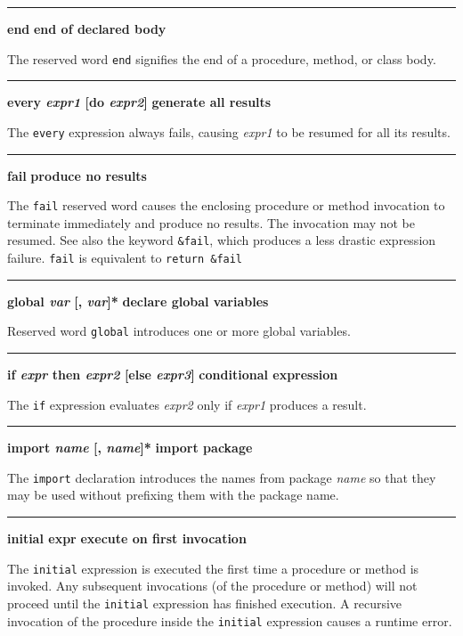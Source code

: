 \bigskip\hrule\vspace{0.1cm}
\noindent
{\bf end } \hfill {\bf end of declared body}

\noindent
{}The reserved word \texttt{end} signifies the end of a
procedure, method, or class body.

\bigskip\hrule\vspace{0.1cm}
\noindent
{\bf \textbf{every} \textit{expr1} [do \textit{expr2}] } \hfill {\bf generate all results}

\noindent
{}The \texttt{every} expression always fails, causing
\textit{expr1} to be resumed for all its results.

\bigskip\hrule\vspace{0.1cm}
\noindent
{\bf fail } \hfill {\bf produce no results}

\noindent
{}The \texttt{fail} reserved word causes the enclosing
procedure or method invocation to terminate immediately and produce no
results. The invocation may not be resumed. See also the keyword
\texttt{\&fail}, which produces a less drastic expression failure.
\texttt{fail} is equivalent to \texttt{return \&fail}

\bigskip\hrule\vspace{0.1cm}
\noindent
{\bf \textbf{global} \textit{var} [, \textit{var}]* } \hfill {\bf declare global variables}

\noindent
{}Reserved word \texttt{global} introduces one or more
global variables.

\bigskip\hrule\vspace{0.1cm}
\noindent
{\bf \textbf{if} \textit{expr} then \textit{expr2} [else \textit{expr3}] } \hfill {\bf conditional expression}

\noindent
{}The \texttt{if} expression evaluates \textit{expr2} only if
\textit{expr1} produces a result.

\bigskip\hrule\vspace{0.1cm}
\noindent
{\bf \textbf{import} \textit{name} [, \textit{name}]* } \hfill {\bf import package}

\noindent
{}The \texttt{import} declaration introduces the names from
package \textit{name} so that they may be used without prefixing them
with the package name.

\bigskip\hrule\vspace{0.1cm}
\noindent
{\bf initial expr } \hfill {\bf execute on first invocation}

\noindent
{}The \texttt{initial} expression is executed the first
time a procedure or method is invoked.
Any subsequent invocations (of the procedure or method) \ConcurrencyIssue
will not proceed until the \texttt{initial} expression has finished execution.
A recursive invocation of the procedure inside the \texttt{initial} expression
causes a runtime error.

